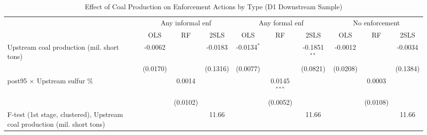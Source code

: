 
\begin{table}[htbp]
   
   \caption{\label{tab:h3_inf_formal_d12_ivsumcoaltons} Effect of Coal Production on Enforcement Actions by Type (D1 Downstream Sample)}
   \bigskip
   
   \centering
   
   \begin{adjustbox}{width = \textwidth, center}
      
      
      \begin{tabular}{lccccccccc}
         \toprule
         
          & \multicolumn{3}{c}{Any informal enf} & \multicolumn{3}{c}{Any formal enf} & \multicolumn{3}{c}{No enforcement}\\
         
                                                                                   & OLS           & RF            & 2SLS          & OLS           & RF             & 2SLS           & OLS           & RF            & 2SLS\\  
         
         \midrule 
         Upstream coal production (mil. short tons)                                & -0.0062       &               & -0.0183       & -0.0134$^{*}$ &                & -0.1851$^{**}$ & -0.0012       &               & -0.0034\\   
                                                                                   & (0.0170)      &               & (0.1316)      & (0.0077)      &                & (0.0821)       & (0.0208)      &               & (0.1384)\\   
         post95 $\times$ Upstream sulfur \%                                        &               & 0.0014        &               &               & 0.0145$^{***}$ &                &               & 0.0003        &   \\   
                                                                                   &               & (0.0102)      &               &               & (0.0052)       &                &               & (0.0108)      &   \\   
         
         F-test (1st stage, clustered), Upstream coal production (mil. short tons) &               &               & 11.66         &               &                & 11.66          &               &               & 11.66\\  
         

\end{tabular}
\end{adjustbox}
\end{table}
